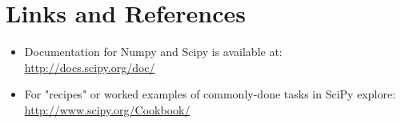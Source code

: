 \documentclass[12pt]{article}
\begin{document}
\section{Links and References}
\begin{itemize}
\item Documentation for Numpy and Scipy is available at: \url{http://docs.scipy.org/doc/}
  \item For "recipes" or worked examples of commonly-done tasks in SciPy explore: \url{http://www.scipy.org/Cookbook/}
\end{itemize}
\end{document}
